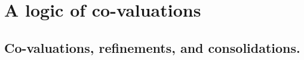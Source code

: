 \documentclass[12pt]{amsart}
\theoremstyle{plain}
\newtheorem{remark}[theorem]{\bf Remark}
\newcommand \mesh{{\rm{mesh}}}
\newcommand {\cl}[1]{{\rm{cl}(#1)}}
\newcommand \Sp{{\mathsf{S}}}
\newcommand \PPb{\mathbb{P}}
\begin{document}
		




\section{A logic of co-valuations}
	
	\subsection{Co-valuations, refinements, and consolidations.} 
	
	
\end{document}
